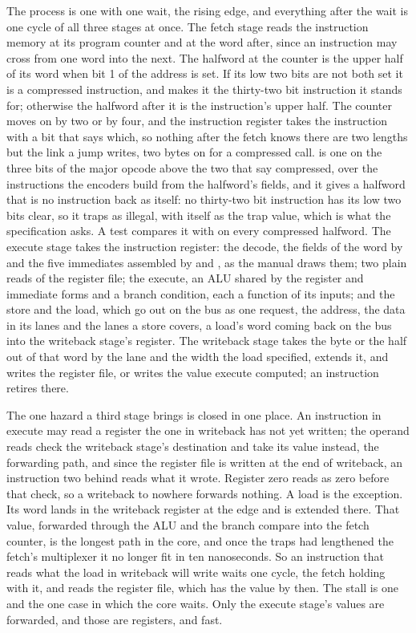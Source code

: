 \documentclass[journal,onecolumn,9pt]{IEEEtran}
\begin{document}
The process is one  with one wait, the rising edge, and
everything after the wait is one cycle of all three stages at once.
The fetch stage reads the instruction memory at its program counter
and at the word after, since an instruction may cross from one word
into the next. The halfword at the counter is the upper half of its
word when bit 1 of the address is set. If its low two bits are not
both set it is a compressed instruction, and  makes it
the thirty-two bit instruction it stands for; otherwise the halfword
after it is the instruction's upper half. The counter moves on by two
or by four, and the instruction register takes the instruction with
a bit that says which, so nothing after the fetch knows there are two
lengths but the link a jump writes, two bytes on for a compressed
call.  is one  on the three bits of the
major opcode above the two that say compressed, over the instructions
the encoders build from the halfword's fields, and it gives a halfword
that is no instruction back as itself: no thirty-two bit instruction
has its low two bits clear, so it traps as illegal, with itself as
the trap value, which is what the specification asks. A test compares
it with  on every compressed halfword. The
execute stage takes the instruction register:
the decode, the fields of the word by  and the five
immediates assembled by  and , as the manual
draws them; two plain reads of the register file; the execute, an
ALU shared by the register and immediate forms and a branch
condition, each a function of its inputs; and the store and the
load, which go out on the bus as one request, the address, the data
in its lanes and the lanes a store covers, a load's word coming back
on the bus into the writeback stage's register. The writeback stage
takes the byte or the half out of that word by the lane and the
width the load specified, extends it, and writes the register file, or
writes the value execute computed; an instruction retires there.

The one hazard a third stage brings is closed in one place. An
instruction in execute may read a register the one in writeback has
not yet written; the operand reads check the writeback stage's
destination and take its value instead, the forwarding path, and
since the register file is written at the end of writeback, an
instruction two behind reads what it wrote. Register zero reads as
zero before that check, so a writeback to nowhere forwards nothing.
A load is the exception. Its word lands in the writeback register at
the edge and is extended there. That value, forwarded through the
ALU and the branch compare into the fetch counter, is the longest
path in the core, and once the traps had lengthened the fetch's
multiplexer it no longer fit in ten nanoseconds. So an instruction
that reads what the load in writeback will write waits one cycle,
the fetch holding with it, and reads the register file, which has
the value by then. The stall is one  and the one case in
which the core waits. Only the execute stage's values are forwarded,
and those are registers, and fast.
\end{document}
